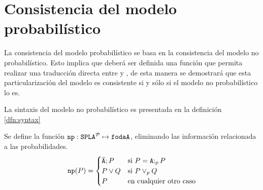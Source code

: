 \section{Consistencia del modelo probabilístico}

La consistencia del modelo probabilístico se basa en la
consistencia del modelo no probabilístico. Esto implica
que deberá ser definida una función que permita realizar
una traducción directa entre \fodaPAp y \fodaPA,
de esta manera se demostrará que esta particularización
del modelo es consistente si y sólo si el modelo
no probabilístico lo es.


La sintaxis del modelo no probabilístico es presentada en la definición \ref{dfn:syntax}

\bdfn
  Se define la función $\mathtt{np}:\mathtt{SPLA{^{\cal P}}}\mapsto \mathtt{fodaA}$, 
  eliminando las información relacionada a las probabilidades.
  \begin{displaymath}
     \mathtt{np}(P)=
     \begin{cases}
       \overline{\mathtt{A}};P & \mathrm{si}\ P=\mathtt{A};_pP\\
       P \mathbin{\lor} Q & \mathrm{si}\ P \mathbin{\lor}_{p} Q \\
       P & \mathrm{en\ cualquier\ otro\ caso}
     \end{cases}
  \end{displaymath}
\edfn



